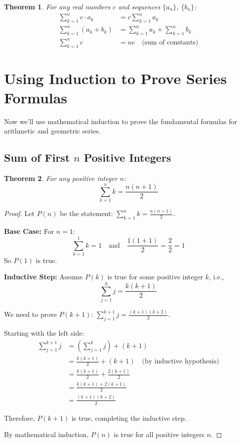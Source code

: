 \documentclass[12pt]{article}
\newtheorem{theorem}{Theorem}
\begin{document}
\begin{theorem}
For any real numbers $c$ and sequences $\{a_n\}$, $\{b_n\}$:
\begin{align}
\sum_{k=1}^{n} c \cdot a_k &= c \sum_{k=1}^{n} a_k \\
\sum_{k=1}^{n} (a_k + b_k) &= \sum_{k=1}^{n} a_k + \sum_{k=1}^{n} b_k \\
\sum_{k=1}^{n} c &= nc \quad \text{(sum of constants)}
\end{align}
\end{theorem}

\section{Using Induction to Prove Series Formulas}

Now we'll use mathematical induction to prove the fundamental formulas for arithmetic and geometric series.

\subsection{Sum of First $n$ Positive Integers}

\begin{theorem}
For any positive integer $n$:
$$\sum_{k=1}^{n} k = \frac{n(n+1)}{2}$$
\end{theorem}

\begin{proof}
Let $P(n)$ be the statement: $\sum_{k=1}^{n} k = \frac{n(n+1)}{2}$.

\textbf{Base Case:} For $n = 1$:
$$\sum_{k=1}^{1} k = 1 \quad \text{and} \quad \frac{1(1+1)}{2} = \frac{2}{2} = 1$$
So $P(1)$ is true.

\textbf{Inductive Step:} Assume $P(k)$ is true for some positive integer $k$, i.e.,
$$\sum_{j=1}^{k} j = \frac{k(k+1)}{2}$$

We need to prove $P(k+1)$: $\sum_{j=1}^{k+1} j = \frac{(k+1)(k+2)}{2}$.

Starting with the left side:
\begin{align}
\sum_{j=1}^{k+1} j &= \left(\sum_{j=1}^{k} j\right) + (k+1) \\
&= \frac{k(k+1)}{2} + (k+1) \quad \text{(by inductive hypothesis)} \\
&= \frac{k(k+1)}{2} + \frac{2(k+1)}{2} \\
&= \frac{k(k+1) + 2(k+1)}{2} \\
&= \frac{(k+1)(k+2)}{2}
\end{align}

Therefore, $P(k+1)$ is true, completing the inductive step.

By mathematical induction, $P(n)$ is true for all positive integers $n$.
\end{proof}
\end{document}

